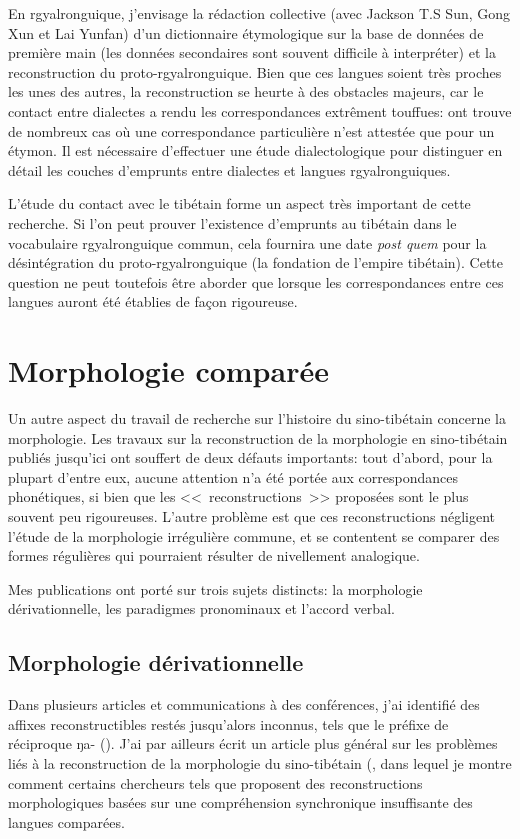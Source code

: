 \documentclass[oldfontcommands,oneside,a4paper,11pt]{memoir}
\begin{document}
En rgyalronguique, j'envisage la rédaction collective (avec Jackson T.S Sun, Gong Xun et Lai Yunfan) d'un dictionnaire étymologique sur la base de données de première main (les données secondaires sont souvent difficile à interpréter) et la reconstruction du proto-rgyalronguique. Bien que ces langues soient très proches les unes des autres, la reconstruction se heurte à des obstacles majeurs, car le contact entre dialectes a rendu les correspondances extrêment touffues: ont trouve de nombreux cas où une correspondance particulière n'est attestée que pour un étymon. Il est nécessaire d'effectuer une étude dialectologique pour distinguer en détail les couches d'emprunts entre dialectes et langues rgyalronguiques. 


L'étude du contact avec le tibétain forme un aspect très important de cette recherche. Si l'on peut prouver l'existence d'emprunts au tibétain dans le vocabulaire rgyalronguique commun, cela fournira une date \textit{post quem} pour la désintégration du proto-rgyalronguique (la fondation de l'empire tibétain). Cette question ne peut toutefois être aborder que lorsque les correspondances entre ces langues auront été établies de façon rigoureuse.

\section{Morphologie comparée}
	Un autre aspect du travail de recherche sur l’histoire du sino-tibétain concerne la morphologie. Les travaux sur la reconstruction de la morphologie en sino-tibétain publiés jusqu’ici ont souffert de deux défauts importants: tout d’abord, pour la plupart d’entre eux, aucune attention n’a été portée aux correspondances phonétiques, si bien que les <<~reconstructions~>> proposées sont le plus souvent peu rigoureuses. L’autre problème est que ces reconstructions négligent l’étude de la morphologie irrégulière commune, et se contentent se comparer des formes régulières qui pourraient résulter de nivellement analogique.
	
	Mes publications ont porté sur trois sujets distincts: la morphologie dérivationnelle, les paradigmes pronominaux et l'accord verbal. 
	\subsection{Morphologie dérivationnelle}
	Dans plusieurs articles et communications à des conférences, j’ai identifié des affixes reconstructibles restés jusqu’alors inconnus, tels que le préfixe de réciproque ŋa- (\citealt{jacques07passif}). J’ai par ailleurs écrit un article plus général sur les problèmes liés à la reconstruction de la morphologie du sino-tibétain (\citealt{jacques06morpho}, dans lequel je montre comment certains chercheurs tels que \citet{matisoff03} proposent des reconstructions morphologiques basées sur une compréhension synchronique insuffisante des langues comparées.
\end{document}
